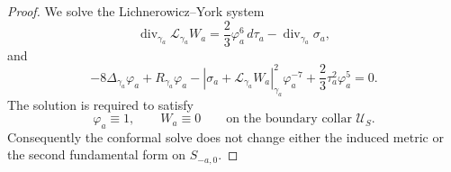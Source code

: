 \documentclass{amsart}
\begin{document}
{\begin{proof}
\noindent We solve the Lichnerowicz--York system
\begin{equation}
\label{eq:LY-vector-balanced}
        \operatorname{div}_{\gamma_a}
        \mathcal L_{\gamma_a}W_a
        =
        \frac23\varphi_a^6\,d\tau_a
        -
        \operatorname{div}_{\gamma_a}\sigma_a,
\end{equation}
and
\begin{equation}
\label{eq:LY-scalar-balanced}
        -8\Delta_{\gamma_a}\varphi_a
        +
        R_{\gamma_a}\varphi_a
        -
        |\sigma_a+\mathcal L_{\gamma_a}W_a|_{\gamma_a}^2
        \varphi_a^{-7}
        +
        \frac23\tau_a^2\varphi_a^5
        =
        0.
\end{equation}
The solution is required to satisfy
\[
        \varphi_a\equiv1,
        \qquad
        W_a\equiv0
        \qquad\text{on the boundary collar }\mathcal U_S.
\]
Consequently the conformal solve does not change either the induced
metric or the second fundamental form on \(S_{-a,0}\).


\end{proof}}
\end{document}
